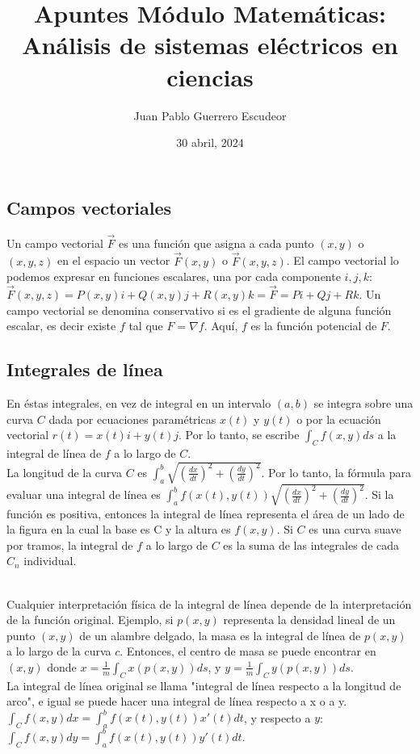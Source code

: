 \documentclass[12pt, letterpaper]{report}
\title{Apuntes Módulo Matemáticas: Análisis de sistemas eléctricos en ciencias}
\author{Juan Pablo Guerrero Escudeor}
\date{30 abril, 2024}
\begin{document}
\maketitle
\subsection*{Campos vectoriales}
Un campo vectorial $\vec{F}$ es una función que asigna a cada punto $(x, y)$ o $(x, y, z)$ en el espacio un vector $\vec{F}(x, y)$ o 
$\vec{F}(x, y, z)$. El campo vectorial lo podemos expresar en funciones escalares, una por cada componente $i, j, k$: 
$\vec{F}(x, y, z) = P(x, y)i + Q(x, y)j + R(x, y)k = \vec{F} = Pi + Qj + Rk$. Un campo vectorial se denomina 
conservativo si es el gradiente de alguna función escalar, es decir existe $f$ tal que $F = \nabla f$. Aquí, $f$ 
es la función potencial de $F$. 
\subsection*{Integrales de línea}
En éstas integrales, en vez de integral en un intervalo $(a, b)$ se integra sobre una curva $C$ dada por ecuaciones paramétricas $x(t)$ y $y(t)$ o 
por la ecuación vectorial $r(t) = x(t)i + y(t)j$. Por lo tanto, se escribe $\int_C f(x, y)ds$ a la integral 
de línea de $f$ a lo largo de $C$. \\

La longitud de la curva $C$ es $\int_{a}^{b} \sqrt{(\frac{dx}{dt})^2 + (\frac{dy}{dt})^2}$. Por lo tanto, la fórmula 
para evaluar una integral de línea es $\int_{a}^{b}f(x(t), y(t))\sqrt{(\frac{dx}{dt})^2 + (\frac{dy}{dt})^2}$. Si la función es positiva, 
entonces la integral de línea representa el área de un lado de la figura en la cual la base es C y la altura es $f(x, y)$. Si $C$ es una 
curva suave por tramos, la integral de $f$ a lo largo de $C$ es la suma de las integrales de cada $C_n$ individual. \\ 

Cualquier interpretación física de la integral de línea depende de la interpretación de la función original. Ejemplo, si $p(x, y)$ representa 
la densidad lineal de un punto $(x, y)$ de un alambre delgado, la masa es la integral de línea de $p(x, y)$ a lo largo de la curva $c$. Entonces, el 
centro de masa se puede encontrar en $(x, y)$ donde $x = \frac{1}{m}\int_Cx(p(x, y))ds$, y $y = \frac{1}{m}\int_Cy(p(x, y))ds$. \\

La integral de línea original se llama "integral de línea respecto a la longitud de arco", e igual se puede 
hacer una integral de línea respecto a x o a y. $\int_C f(x, y)dx = \int_{a}^{b}f(x(t), y(t))x'(t)dt$, y respecto a $y$: 
$\int_Cf(x, y)dy = \int_{a}^{b} f(x(t), y(t))y'(t)dt$. \\ 
\end{document}
